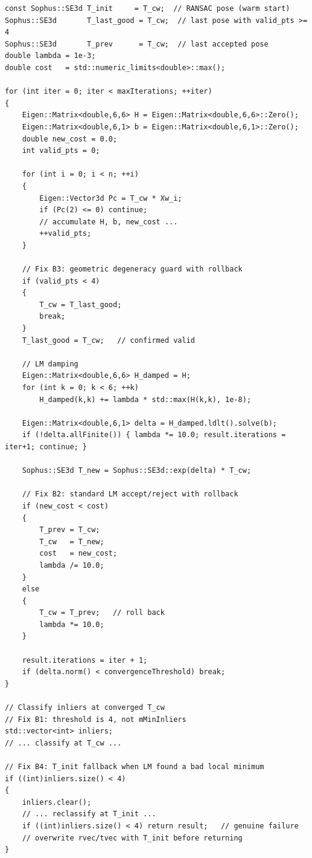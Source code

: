 \documentclass[12pt,a4paper]{article}
\begin{document}
\begin{lstlisting}[style=cpp,
  caption={Complete LM loop with all robustness fixes ---
           \texttt{relocalization.cpp}}]
const Sophus::SE3d T_init     = T_cw;  // RANSAC pose (warm start)
Sophus::SE3d       T_last_good = T_cw;  // last pose with valid_pts >= 4
Sophus::SE3d       T_prev      = T_cw;  // last accepted pose
double lambda = 1e-3;
double cost   = std::numeric_limits<double>::max();

for (int iter = 0; iter < maxIterations; ++iter)
{
    Eigen::Matrix<double,6,6> H = Eigen::Matrix<double,6,6>::Zero();
    Eigen::Matrix<double,6,1> b = Eigen::Matrix<double,6,1>::Zero();
    double new_cost = 0.0;
    int valid_pts = 0;

    for (int i = 0; i < n; ++i)
    {
        Eigen::Vector3d Pc = T_cw * Xw_i;
        if (Pc(2) <= 0) continue;
        // accumulate H, b, new_cost ...
        ++valid_pts;
    }

    // Fix B3: geometric degeneracy guard with rollback
    if (valid_pts < 4)
    {
        T_cw = T_last_good;
        break;
    }
    T_last_good = T_cw;   // confirmed valid

    // LM damping
    Eigen::Matrix<double,6,6> H_damped = H;
    for (int k = 0; k < 6; ++k)
        H_damped(k,k) += lambda * std::max(H(k,k), 1e-8);

    Eigen::Matrix<double,6,1> delta = H_damped.ldlt().solve(b);
    if (!delta.allFinite()) { lambda *= 10.0; result.iterations = iter+1; continue; }

    Sophus::SE3d T_new = Sophus::SE3d::exp(delta) * T_cw;

    // Fix B2: standard LM accept/reject with rollback
    if (new_cost < cost)
    {
        T_prev = T_cw;
        T_cw   = T_new;
        cost   = new_cost;
        lambda /= 10.0;
    }
    else
    {
        T_cw = T_prev;   // roll back
        lambda *= 10.0;
    }

    result.iterations = iter + 1;
    if (delta.norm() < convergenceThreshold) break;
}

// Classify inliers at converged T_cw
// Fix B1: threshold is 4, not mMinInliers
std::vector<int> inliers;
// ... classify at T_cw ...

// Fix B4: T_init fallback when LM found a bad local minimum
if ((int)inliers.size() < 4)
{
    inliers.clear();
    // ... reclassify at T_init ...
    if ((int)inliers.size() < 4) return result;   // genuine failure
    // overwrite rvec/tvec with T_init before returning
}
\end{lstlisting}
\end{document}
